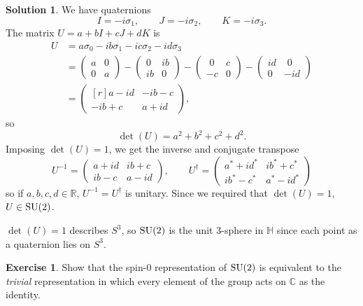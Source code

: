 \documentclass[11pt, a4paper]{report}
\theoremstyle{definition}
\newtheorem{ex}{Exercise}[part]
\newtheorem{sol}{Solution}[part]
\newcommand*{\SU}{\ensuremath\text{SU}}
\begin{document}
\begin{sol}

We have quaternions
\[
    I = -i\sigma_1, \qquad
    J = -i\sigma_2, \qquad
    K = -i\sigma_3.
\]
The matrix $U = a + bI + cJ + dK$ is
\begin{align*}
    U &= a \sigma_0 - ib\sigma_1 -ic \sigma_2 -id \sigma_3 \\
    &= \begin{pmatrix}
        a & 0 \\
        0 & a
    \end{pmatrix}
    -
    \begin{pmatrix}
        0 & ib \\
        ib & 0
    \end{pmatrix}
    -
    \begin{pmatrix}
        \,\, 0 & c \\
        -c &  0
    \end{pmatrix}
    -
    \begin{pmatrix}
        id & \,\, 0 \\
        0 & -id
    \end{pmatrix} \\
    &=
    \begin{pmatrix*}[r]
        a - id  & -ib - c \\
        -ib + c & a + id
    \end{pmatrix*},
\end{align*}
so
\[
    \det(U) = a^2 + b^2 + c^2 + d^2.
\]
Imposing $\det(U) = 1$, we get the inverse and conjugate transpose
\[
    U^{-1} =
        \begin{pmatrix}
            a + id & ib + c \\
            ib - c & a - id
        \end{pmatrix}, \qquad
    U^\dagger =
        \begin{pmatrix}
            a^* + id^* & ib^* + c^* \\
            ib^* -c^* & a^* - id^*
        \end{pmatrix}
\]
so if $a, b, c, d \in \mathbb{R}$, $U^{-1} = U^\dagger$ is unitary.
Since we required that $\det(U) = 1$, $U \in \SU(2)$.

$\det(U) = 1$ describes $S^3$, so $\SU(2)$ is the unit 3-sphere in $\mathbb{H}$ since each point as a quaternion lies on $S^3$.

\end{sol}

\begin{ex}

Show that the spin-0 representation of $\SU(2)$ is equivalent to the \emph{trivial} representation in which every element of the group acts on $\mathbb{C}$ as the identity.

\end{ex}
\end{document}
